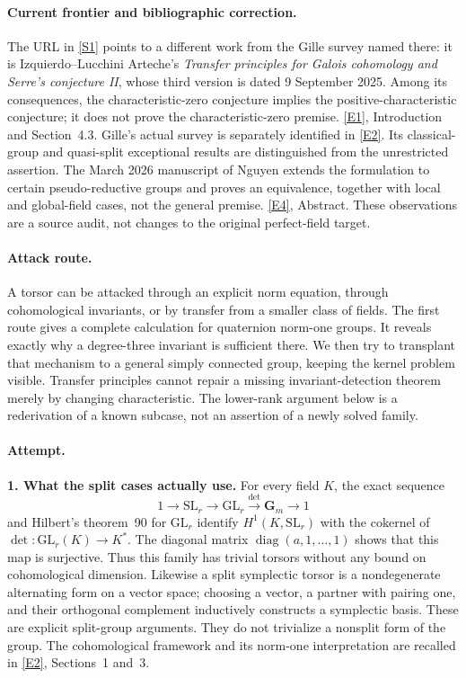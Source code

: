 \documentclass[11pt,a4paper]{article}
\newcommand{\sref}[2]{\hyperlink{source:#1:#2}{[S#2]}}
\newcommand{\eref}[2]{\hyperlink{extra:#1:#2}{[E#2]}}
\numberwithin{equation}{section}
\begin{document}
\paragraph{Current frontier and bibliographic correction.}
The URL in \sref{30006799}{1} points to a different work from the Gille survey
named there: it is Izquierdo--Lucchini Arteche's \emph{Transfer principles
for Galois cohomology and Serre's conjecture II}, whose third version is
dated 9 September 2025. Among its consequences, the characteristic-zero
conjecture implies the positive-characteristic conjecture; it does not
prove the characteristic-zero premise. \eref{30006799}{1}, Introduction and
Section~4.3. Gille's actual survey is separately identified in
\eref{30006799}{2}. Its classical-group and quasi-split exceptional results
are distinguished from the unrestricted assertion.
The March 2026 manuscript of Nguyen extends the formulation to certain
pseudo-reductive groups and proves an equivalence, together with local
and global-field cases, not the general premise. \eref{30006799}{4}, Abstract.
These observations are a source audit, not changes to the original
perfect-field target.

\paragraph{Attack route.}
A torsor can be attacked through an explicit norm equation, through
cohomological invariants, or by transfer from a smaller class of fields.
The first route gives a complete calculation for quaternion norm-one
groups. It reveals exactly why a degree-three invariant is sufficient
there. We then try to transplant that mechanism to a general simply
connected group, keeping the kernel problem visible. Transfer principles
cannot repair a missing invariant-detection theorem merely by changing
characteristic. The lower-rank argument below is a rederivation of a
known subcase, not an assertion of a newly solved family.

\paragraph{Attempt.}
\textbf{1. What the split cases actually use.}
For every field $K$, the exact sequence
\[
 1\longrightarrow\mathrm{SL}_r\longrightarrow\mathrm{GL}_r
       \xrightarrow{\det}\mathbf G_m\longrightarrow1
\]
and Hilbert's theorem~90 for $\mathrm{GL}_r$ identify
$H^1(K,\mathrm{SL}_r)$ with the cokernel of
$\det:\mathrm{GL}_r(K)\to K^*$. The diagonal matrix
$\operatorname{diag}(a,1,\ldots,1)$ shows that this map is surjective.
Thus this family has trivial torsors without any bound on cohomological
dimension. Likewise a split symplectic torsor is a nondegenerate
alternating form on a vector space; choosing a vector, a partner with
pairing one, and their orthogonal complement inductively constructs a
symplectic basis. These are explicit split-group arguments. They do
not trivialize a nonsplit form of the group. The cohomological framework
and its norm-one interpretation are recalled in \eref{30006799}{2}, Sections~1
and~3.
\end{document}
